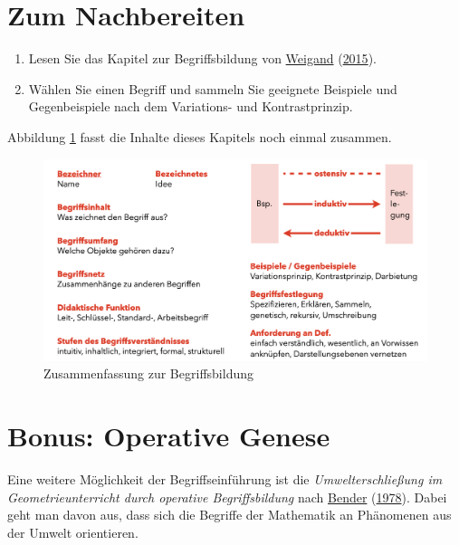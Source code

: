 \documentclass[
  ngerman,
]{scrbook}
\providecommand{\tightlist}{%
  \setlength{\itemsep}{0pt}\setlength{\parskip}{0pt}}
\theoremstyle{definition}
\theoremstyle{definition}
\theoremstyle{definition}
\theoremstyle{definition}
\theoremstyle{remark}
\begin{document}
\hypertarget{begriffe-handwerk-nachbereitung}{%
\section{Zum Nachbereiten}\label{begriffe-handwerk-nachbereitung}}

\begin{enumerate}
\def\labelenumi{\arabic{enumi}.}
\tightlist
\item
  Lesen Sie das Kapitel zur Begriffsbildung von \protect\hyperlink{ref-Weigand2015}{Weigand} (\protect\hyperlink{ref-Weigand2015}{2015}).
\item
  Wählen Sie einen Begriff und sammeln Sie geeignete Beispiele und Gegenbeispiele nach dem Variations- und Kontrastprinzip.
\end{enumerate}

Abbildung \ref{fig:BegriffeZusammenfassung} fasst die Inhalte dieses Kapitels noch einmal zusammen.

\begin{figure}

{\centering \includegraphics[width=0.9\linewidth]{pictures/6-Zusammenfassung} 

}

\caption{Zusammenfassung zur Begriffsbildung}\label{fig:BegriffeZusammenfassung}
\end{figure}

\hypertarget{bonus-operative-genese}{%
\section{Bonus: Operative Genese}\label{bonus-operative-genese}}

Eine weitere Möglichkeit der Begriffseinführung ist die \emph{Umwelterschließung im Geometrieunterricht durch operative Begriffsbildung} nach \protect\hyperlink{ref-Bender1978}{Bender} (\protect\hyperlink{ref-Bender1978}{1978}). Dabei geht man davon aus, dass sich die Begriffe der Mathematik an Phänomenen aus der Umwelt orientieren.
\end{document}
